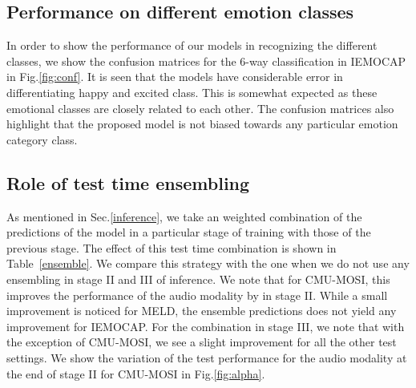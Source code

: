 \documentclass[lettersize,journal]{IEEEtran}
\begin{document}
\subsection{Performance on different emotion classes}
In order to show the performance of our models in recognizing the different classes, we show the confusion matrices for the 6-way classification in IEMOCAP in Fig.\ref{fig:conf}. It is seen that the models have considerable error in differentiating happy and excited class. This is somewhat expected as these emotional classes are closely related to each other. The confusion matrices also highlight that the proposed model is not biased towards any particular emotion category class. 
\subsection{Role of test time ensembling}
As mentioned in Sec.\ref{inference}, we take an weighted combination of the predictions of the model in a particular stage of training with those of the previous stage. The effect of this test time combination is shown in Table~\ref{ensemble}. We compare this strategy with the one when we do not use any ensembling in stage II and III of inference. We note that for CMU-MOSI, this improves the performance of the audio modality by  in stage II. While a small improvement is noticed for MELD, the ensemble predictions does not yield any improvement for IEMOCAP. For the combination in stage III, we note that with the exception of CMU-MOSI, we see a slight improvement for all the other test settings. We show the variation of the test performance for the audio modality at the end of stage II for CMU-MOSI in Fig.\ref{fig:alpha}.
\end{document}
